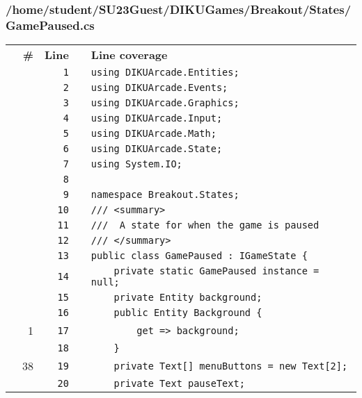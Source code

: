 \documentclass[a4paper,landscape,10pt]{article}
\begin{document}
\subsubsection{/home/student/SU23Guest/DIKUGames/Breakout/States/GamePaused.cs}
\begin{longtable}[l]{lrrll}
\textbf{} & \textbf{\#} & \textbf{Line} & \textbf{} & \textbf{Line coverage}\\
\cellcolor{gray} &  & \verb~1~ & & \verb~using DIKUArcade.Entities;~\\
\cellcolor{gray} &  & \verb~2~ & & \verb~using DIKUArcade.Events;~\\
\cellcolor{gray} &  & \verb~3~ & & \verb~using DIKUArcade.Graphics;~\\
\cellcolor{gray} &  & \verb~4~ & & \verb~using DIKUArcade.Input;~\\
\cellcolor{gray} &  & \verb~5~ & & \verb~using DIKUArcade.Math;~\\
\cellcolor{gray} &  & \verb~6~ & & \verb~using DIKUArcade.State;~\\
\cellcolor{gray} &  & \verb~7~ & & \verb~using System.IO;~\\
\cellcolor{gray} &  & \verb~8~ & & \verb~~\\
\cellcolor{gray} &  & \verb~9~ & & \verb~namespace Breakout.States;~\\
\cellcolor{gray} &  & \verb~10~ & & \verb~/// <summary>~\\
\cellcolor{gray} &  & \verb~11~ & & \verb~///  A state for when the game is paused~\\
\cellcolor{gray} &  & \verb~12~ & & \verb~/// </summary>~\\
\cellcolor{gray} &  & \verb~13~ & & \verb~public class GamePaused : IGameState {~\\
\cellcolor{gray} &  & \verb~14~ & & \verb~    private static GamePaused instance = null;~\\
\cellcolor{gray} &  & \verb~15~ & & \verb~    private Entity background;~\\
\cellcolor{gray} &  & \verb~16~ & & \verb~    public Entity Background {~\\
\cellcolor{green} & 1 & \verb~17~ & & \verb~        get => background;~\\
\cellcolor{gray} &  & \verb~18~ & & \verb~    }~\\
\cellcolor{green} & 38 & \verb~19~ & & \verb~    private Text[] menuButtons = new Text[2];~\\
\cellcolor{gray} &  & \verb~20~ & & \verb~    private Text pauseText;~\\

\end{longtable}
\end{document}

